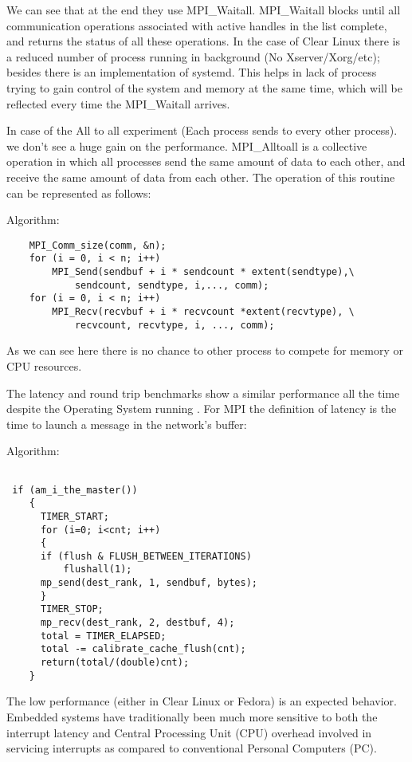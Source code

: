 We can see that at the end they use MPI\_Waitall. MPI\_Waitall blocks until 
all communication operations associated with active handles in the list complete, 
and returns the status of all these operations. In the case of Clear Linux
there is a reduced number of process running in background (No
Xserver/Xorg/etc); besides there is an implementation of systemd. This helps
in lack of process trying to gain control of the system and memory at the same
time, which will be reflected every time the MPI\_Waitall arrives. 


In case of the All to all experiment (Each process sends to every other process). 
we don't see a huge gain on the performance. MPI\_Alltoall is a collective 
operation in which all processes send the same amount of data to each other, 
and receive the same amount of data from each other. The operation of this 
routine can be represented as follows:

Algorithm: 

\begin{lstlisting} 
    MPI_Comm_size(comm, &n); 
    for (i = 0, i < n; i++)
        MPI_Send(sendbuf + i * sendcount * extent(sendtype),\
            sendcount, sendtype, i,..., comm); 
    for (i = 0, i < n; i++) 
        MPI_Recv(recvbuf + i * recvcount *extent(recvtype), \
            recvcount, recvtype, i, ..., comm); 
\end{lstlisting}

As we can see here there is no chance to other process to compete for memory or
CPU resources. 

The latency and round trip benchmarks show a similar performance all the time
despite the Operating System running . For MPI the definition of latency is 
the time to launch a message in the network's buffer: 

Algorithm: 

\begin{lstlisting}

 if (am_i_the_master())
    {
      TIMER_START;
      for (i=0; i<cnt; i++)
      {
	  if (flush & FLUSH_BETWEEN_ITERATIONS)
	      flushall(1);
	  mp_send(dest_rank, 1, sendbuf, bytes);
      }
      TIMER_STOP;
      mp_recv(dest_rank, 2, destbuf, 4);
      total = TIMER_ELAPSED;
      total -= calibrate_cache_flush(cnt);
      return(total/(double)cnt);   
    }

\end{lstlisting}

The low performance (either in Clear Linux or Fedora) is an expected behavior. 
Embedded systems have traditionally been much more sensitive to both the 
interrupt latency and Central Processing Unit (CPU) overhead involved in 
servicing interrupts as compared to conventional Personal Computers (PC).
